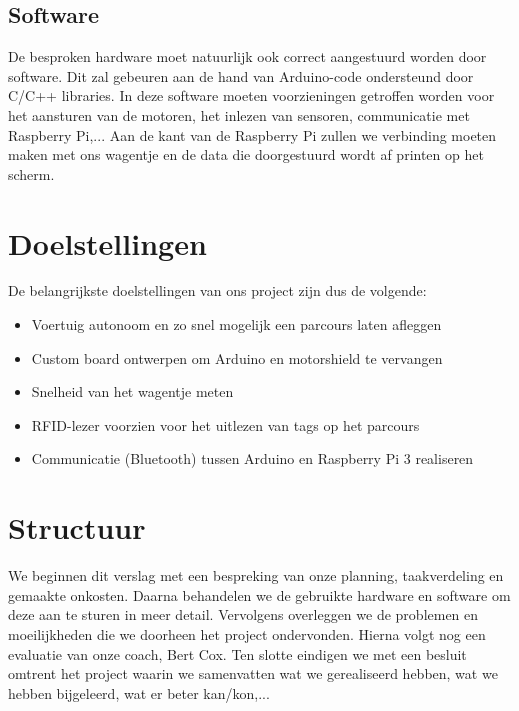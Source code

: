 \subsection{Software}
De besproken hardware moet natuurlijk ook correct aangestuurd worden door software. Dit zal gebeuren aan de hand van Arduino-code ondersteund door C/C++ libraries. In deze software moeten voorzieningen getroffen worden voor het aansturen van de motoren, het inlezen van sensoren, communicatie met Raspberry Pi,...
Aan de kant van de Raspberry Pi zullen we verbinding moeten maken met ons wagentje en de data die doorgestuurd wordt af printen op het scherm.


\section{Doelstellingen}
De belangrijkste doelstellingen van ons project zijn dus de volgende:
\begin{itemize}
	\item Voertuig autonoom en zo snel mogelijk een parcours laten afleggen
	\item Custom board ontwerpen om Arduino en motorshield te vervangen
	\item Snelheid van het wagentje meten
	\item RFID-lezer voorzien voor het uitlezen van tags op het parcours
	\item Communicatie (Bluetooth) tussen Arduino en Raspberry Pi 3 realiseren
\end{itemize}
\section{Structuur}
We beginnen dit verslag met een bespreking van onze planning, taakverdeling en gemaakte onkosten. Daarna behandelen we de gebruikte hardware en software om deze aan te sturen in meer detail. Vervolgens overleggen we de problemen en moeilijkheden die we doorheen het project ondervonden. Hierna volgt nog een evaluatie van onze coach, Bert Cox. Ten slotte eindigen we met een besluit omtrent het project waarin we samenvatten wat we gerealiseerd hebben, wat we hebben bijgeleerd, wat er beter kan/kon,...